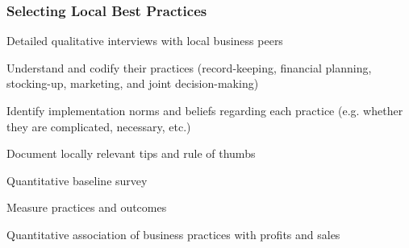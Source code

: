 \documentclass[hideothersubsections, usenames,dvipsnames,11pt]{beamer}
\newenvironment{itemize_2pt}{\itemize\addtolength{\itemsep}{2pt}}{\enditemize}
\begin{document}
\begin{frame}
\frametitle{Selecting Local Best Practices}

Detailed \textcolor{bdf}{qualitative interviews} with local business peers
    \begin{itemize_2pt}
    \item Understand and codify their practices (record-keeping, financial planning, stocking-up, marketing, and joint decision-making)
    \item Identify implementation norms and beliefs regarding each practice (e.g. whether they are complicated, necessary, etc.)
    \item Document locally relevant tips and rule of thumbs
    \end{itemize_2pt}
    
\vspace{0.1in}

\textcolor{bdf}{Quantitative baseline survey}
    \begin{itemize_2pt}
    \item Measure practices and outcomes
    \item Quantitative association of business practices with profits and sales
    \end{itemize_2pt}

\end{frame}
\end{document}
